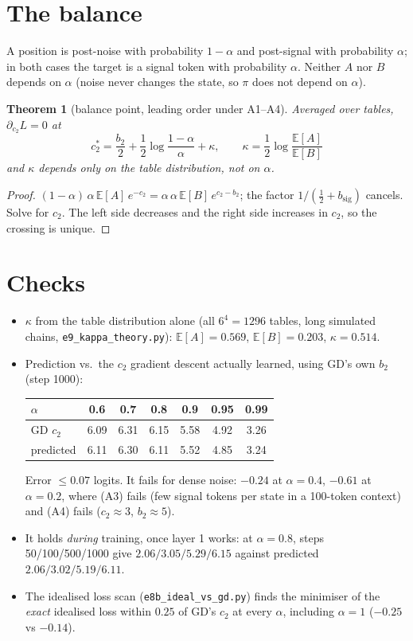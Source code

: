 \documentclass[11pt]{article}
\newtheorem{theorem}{Theorem}
\theoremstyle{remark}\newtheorem{remark}{Remark}
\newcommand{\1}{\mathbf{1}}
\begin{document}
\section{The balance}
A position is post-noise with probability $1-\alpha$ and post-signal with probability $\alpha$; in
both cases the target is a signal token with probability $\alpha$. Neither $A$ nor $B$ depends on
$\alpha$ (noise never changes the state, so $\pi$ does not depend on $\alpha$).

\begin{theorem}[balance point, leading order under A1--A4]
Averaged over tables, $\partial_{c_2}L=0$ at
\[
\boxed{\,c_2^\ast=\frac{b_2}{2}+\frac12\log\frac{1-\alpha}{\alpha}+\kappa,\qquad
\kappa=\frac12\log\frac{\mathbb E[A]}{\mathbb E[B]}\,}
\]
and $\kappa$ depends only on the table distribution, not on $\alpha$.
\end{theorem}
\begin{proof}
$(1-\alpha)\,\alpha\,\mathbb E[A]\,e^{-c_2}=\alpha\,\alpha\,\mathbb E[B]\,e^{c_2-b_2}$; the factor
$1/(\tfrac12+b_{\mathrm{sig}})$ cancels. Solve for $c_2$. The left side decreases and the right side
increases in $c_2$, so the crossing is unique.
\end{proof}

\section{Checks}
\begin{itemize}
\item $\kappa$ from the table distribution alone (all $6^4=1296$ tables, long simulated chains,
\texttt{e9\_kappa\_theory.py}): $\mathbb E[A]=0.569$, $\mathbb E[B]=0.203$, $\kappa=0.514$.
\item Prediction vs.\ the $c_2$ gradient descent actually learned, using GD's own $b_2$
(step 1000):
\begin{center}\begin{tabular}{lcccccc}\toprule
$\alpha$ & 0.6 & 0.7 & 0.8 & 0.9 & 0.95 & 0.99\\\midrule
GD $c_2$ & 6.09 & 6.31 & 6.15 & 5.58 & 4.92 & 3.26\\
predicted & 6.11 & 6.30 & 6.11 & 5.52 & 4.85 & 3.24\\\bottomrule\end{tabular}\end{center}
Error $\le0.07$ logits. It fails for dense noise: $-0.24$ at $\alpha=0.4$, $-0.61$ at $\alpha=0.2$,
where (A3) fails (few signal tokens per state in a 100-token context) and (A4) fails
($c_2\approx3$, $b_2\approx5$).
\item It holds \emph{during} training, once layer 1 works: at $\alpha=0.8$, steps 50/100/500/1000
give $2.06/3.05/5.29/6.15$ against predicted $2.06/3.02/5.19/6.11$.
\item The idealised loss scan (\texttt{e8b\_ideal\_vs\_gd.py}) finds the minimiser of the
\emph{exact} idealised loss within $0.25$ of GD's $c_2$ at every $\alpha$, including $\alpha=1$
($-0.25$ vs $-0.14$).
\end{itemize}
\end{document}
